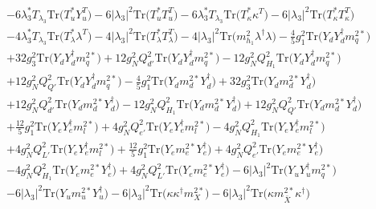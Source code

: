 {\begin{align}
 &-6 \lambda_3^* T_{\lambda_3} \mbox{Tr}\Big({T_u^*  Y_{u}^{T}}\Big) -6 |\lambda_3|^2 \mbox{Tr}\Big({T_u^*  T_{u}^{T}}\Big) -6 \lambda_3^* T_{\lambda_3} \mbox{Tr}\Big({T_{\kappa}^*  \kappa^{T}}\Big) -6 |\lambda_3|^2 \mbox{Tr}\Big({T_{\kappa}^*  T_{\kappa}^{T}}\Big) \nonumber \\ 
 &-4 \lambda_3^* T_{\lambda_3} \mbox{Tr}\Big({T_{\lambda}^*  \lambda^{T}}\Big) -4 |\lambda_3|^2 \mbox{Tr}\Big({T_{\lambda}^*  T_{\lambda}^{T}}\Big) -4 |\lambda_3|^2 \mbox{Tr}\Big({m_{h_1}^2  \lambda^{\dagger}  \lambda}\Big) -\frac{4}{5} g_{1}^{2} \mbox{Tr}\Big({Y_d  Y_{d}^{\dagger}  m_q^{2 *}}\Big) \nonumber \\ 
 &+32 g_{3}^{2} \mbox{Tr}\Big({Y_d  Y_{d}^{\dagger}  m_q^{2 *}}\Big) +12 g_{N}^{2} Q_{d'}^{2} \mbox{Tr}\Big({Y_d  Y_{d}^{\dagger}  m_q^{2 *}}\Big) -12 g_{N}^{2} Q_{H_1}^{2} \mbox{Tr}\Big({Y_d  Y_{d}^{\dagger}  m_q^{2 *}}\Big) \nonumber \\ 
 &+12 g_{N}^{2} Q_{Q'}^{2} \mbox{Tr}\Big({Y_d  Y_{d}^{\dagger}  m_q^{2 *}}\Big) -\frac{4}{5} g_{1}^{2} \mbox{Tr}\Big({Y_d  m_d^{2 *}  Y_{d}^{\dagger}}\Big) +32 g_{3}^{2} \mbox{Tr}\Big({Y_d  m_d^{2 *}  Y_{d}^{\dagger}}\Big) \nonumber \\ 
 &+12 g_{N}^{2} Q_{d'}^{2} \mbox{Tr}\Big({Y_d  m_d^{2 *}  Y_{d}^{\dagger}}\Big) -12 g_{N}^{2} Q_{H_1}^{2} \mbox{Tr}\Big({Y_d  m_d^{2 *}  Y_{d}^{\dagger}}\Big) +12 g_{N}^{2} Q_{Q'}^{2} \mbox{Tr}\Big({Y_d  m_d^{2 *}  Y_{d}^{\dagger}}\Big) \nonumber \\ 
 &+\frac{12}{5} g_{1}^{2} \mbox{Tr}\Big({Y_e  Y_{e}^{\dagger}  m_l^{2 *}}\Big) +4 g_{N}^{2} Q_{e'}^{2} \mbox{Tr}\Big({Y_e  Y_{e}^{\dagger}  m_l^{2 *}}\Big) -4 g_{N}^{2} Q_{H_1}^{2} \mbox{Tr}\Big({Y_e  Y_{e}^{\dagger}  m_l^{2 *}}\Big) \nonumber \\ 
 &+4 g_{N}^{2} Q_{L'}^{2} \mbox{Tr}\Big({Y_e  Y_{e}^{\dagger}  m_l^{2 *}}\Big) +\frac{12}{5} g_{1}^{2} \mbox{Tr}\Big({Y_e  m_e^{2 *}  Y_{e}^{\dagger}}\Big) +4 g_{N}^{2} Q_{e'}^{2} \mbox{Tr}\Big({Y_e  m_e^{2 *}  Y_{e}^{\dagger}}\Big) \nonumber \\ 
 &-4 g_{N}^{2} Q_{H_1}^{2} \mbox{Tr}\Big({Y_e  m_e^{2 *}  Y_{e}^{\dagger}}\Big) +4 g_{N}^{2} Q_{L'}^{2} \mbox{Tr}\Big({Y_e  m_e^{2 *}  Y_{e}^{\dagger}}\Big) -6 |\lambda_3|^2 \mbox{Tr}\Big({Y_u  Y_{u}^{\dagger}  m_q^{2 *}}\Big) \nonumber \\ 
 &-6 |\lambda_3|^2 \mbox{Tr}\Big({Y_u  m_u^{2 *}  Y_{u}^{\dagger}}\Big) -6 |\lambda_3|^2 \mbox{Tr}\Big({\kappa  \kappa^{\dagger}  m_{X}^{2 *}}\Big) -6 |\lambda_3|^2 \mbox{Tr}\Big({\kappa  m_{\bar{X}}^{2 *}  \kappa^{\dagger}}\Big) \nonumber \\ 

\end{align}}
